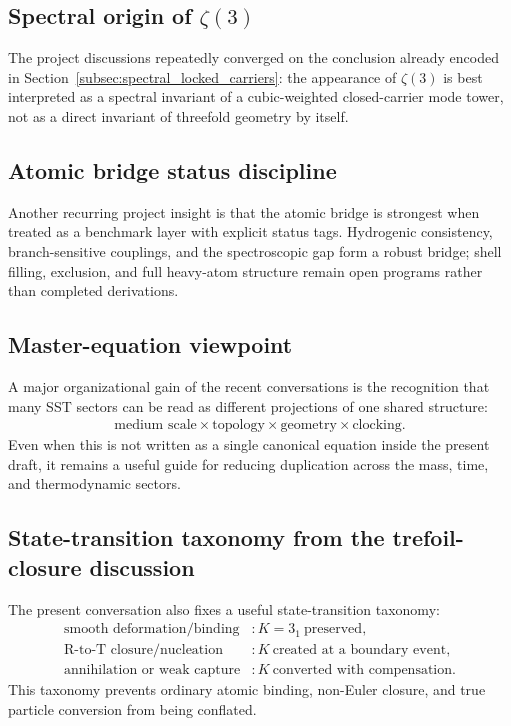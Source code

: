 \documentclass[11pt]{article}
\theoremstyle{definition}
\theoremstyle{plain}
\theoremstyle{remark}
\begin{document}
        \subsection{Spectral origin of \texorpdfstring{$\zeta(3)$}{zeta(3)}}
            The project discussions repeatedly converged on the conclusion already encoded in Section~\ref{subsec:spectral_locked_carriers}: the appearance of $\zeta(3)$ is best interpreted as a spectral invariant of a cubic-weighted closed-carrier mode tower, not as a direct invariant of threefold geometry by itself.

        \subsection{Atomic bridge status discipline}
            Another recurring project insight is that the atomic bridge is strongest when treated as a benchmark layer with explicit status tags. Hydrogenic consistency, branch-sensitive couplings, and the spectroscopic gap form a robust bridge; shell filling, exclusion, and full heavy-atom structure remain open programs rather than completed derivations.

        \subsection{Master-equation viewpoint}
            A major organizational gain of the recent conversations is the recognition that many SST sectors can be read as different projections of one shared structure:
            \begin{align}
                \text{medium scale} \times \text{topology} \times \text{geometry} \times \text{clocking}.
            \end{align}
            Even when this is not written as a single canonical equation inside the present draft, it remains a useful guide for reducing duplication across the mass, time, and thermodynamic sectors.

        \subsection{State-transition taxonomy from the trefoil-closure discussion}
            The present conversation also fixes a useful state-transition taxonomy:
            \begin{align}
                \text{smooth deformation/binding} &: K=3_1\ \text{preserved},\\
                \text{R-to-T closure/nucleation} &: K\ \text{created at a boundary event},\\
                \text{annihilation or weak capture} &: K\ \text{converted with compensation}.
            \end{align}
            This taxonomy prevents ordinary atomic binding, non-Euler closure,
            and true particle conversion from being conflated.
\end{document}
